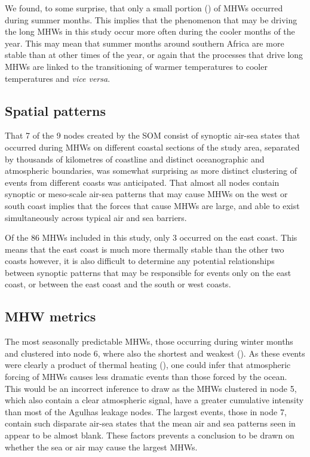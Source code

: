 \documentclass[a4paper,10pt,review]{elsarticle}
\begin{document}
We found, to some surprise, that only a small portion () of MHWs occurred during summer months. This implies that the phenomenon that may be driving the long MHWs in this study occur more often during the cooler months of the year. This may mean that summer months around southern Africa are more stable than at other times of the year, or again that the processes that drive long MHWs are linked to the transitioning of warmer temperatures to cooler temperatures and \emph{vice versa}.

\subsection{Spatial patterns}
That 7 of the 9 nodes created by the SOM consist of synoptic air-sea states that occurred during MHWs on different coastal sections of the study area, separated by thousands of kilometres of coastline and distinct oceanographic and atmospheric boundaries, was somewhat surprising as more distinct clustering of events from different coasts was anticipated. That almost all nodes contain synoptic or meso-scale air-sea patterns that may cause MHWs on the west or south coast implies that the forces that cause MHWs are large, and able to exist simultaneously across typical air and sea barriers.

Of the 86 MHWs included in this study, only 3 occurred on the east coast. This means that the east coast is much more thermally stable than the other two coasts however, it is also difficult to determine any potential relationships between synoptic patterns that may be responsible for events only on the east coast, or between the east coast and the south or west coasts.

\subsection{MHW metrics}
The most seasonally predictable MHWs, those occurring during winter months and clustered into node 6, where also the shortest and weakest (). As these events were clearly a product of thermal heating (), one could infer that atmospheric forcing of MHWs causes less dramatic events than those forced by the ocean. This would be an incorrect inference to draw as the MHWs clustered in node 5, which also contain a clear atmospheric signal, have a greater cumulative intensity than most of the Agulhas leakage nodes. The largest events, those in node 7, contain such disparate air-sea states that the mean air and sea patterns seen in  appear to be almost blank. These factors prevents a conclusion to be drawn on whether the sea or air may cause the largest MHWs.
\end{document}
